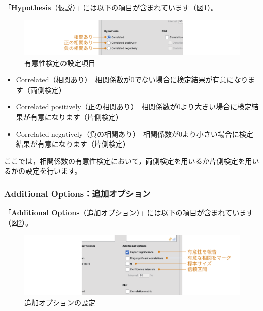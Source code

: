 \documentclass[
  12pt,
  a5jpaper,
  lualatex, ja=standard]{bxjsbook}
\providecommand{\tightlist}{%
  \setlength{\itemsep}{0pt}\setlength{\parskip}{0pt}}
\newenvironment{jmvsettings}{%
	\begin{center}%
	\begin{tcolorbox}[%
		title=設定項目,
		colframe=gmoji,
		colbacktitle=gmoji,
		colback=gmoji!2!white,
		breakable,
		width=.9\textwidth,
		]\small\addtolength{\leftmargini}{-3\labelsep}%
	}%
	{\end{tcolorbox}\end{center}}
\begin{document}
「\textbf{Hypothesis}（仮説）」には以下の項目が含まれています（図\ref{fig:regression-cor-hypothesis}）。

\begin{figure}[!ht]

{\centering \includegraphics[width=1\linewidth]{images/regression/cor-hypothesis} 

}

\caption{有意性検定の設定項目}\label{fig:regression-cor-hypothesis}
\end{figure}

\begin{jmvsettings}

\begin{itemize}
\tightlist
\item
  Correlated（相関あり）　相関係数が0でない場合に検定結果が有意になります（両側検定）
\item
  Correlated positively（正の相関あり）　相関係数が0より大きい場合に検定結果が有意になります（片側検定）
\item
  Correlated negatively（負の相関あり）　相関係数が0より小さい場合に検定結果が有意になります（片側検定）
\end{itemize}

\end{jmvsettings}

ここでは，相関係数の有意性検定において，両側検定を用いるか片側検定を用いるかの設定を行います。

\hypertarget{additional-optionsux8ffdux52a0ux30aaux30d7ux30b7ux30e7ux30f3}{%
\subsubsection*{Additional Options：追加オプション}\label{additional-optionsux8ffdux52a0ux30aaux30d7ux30b7ux30e7ux30f3}}

「\textbf{Additional Options}（追加オプション）」には以下の項目が含まれています（図\ref{fig:regression-cor-option}）。

\begin{figure}[!ht]

{\centering \includegraphics[width=1\linewidth]{images/regression/cor-option} 

}

\caption{追加オプションの設定}\label{fig:regression-cor-option}
\end{figure}
\end{document}
